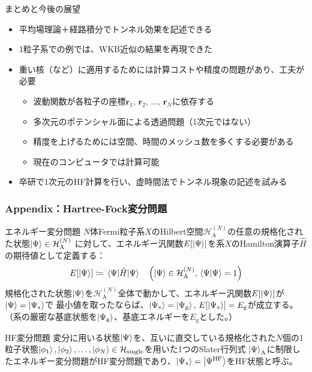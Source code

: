 \documentclass[12pt,aspectratio=169,xcolor=dvipsnames,table,dvipdfmx]{beamer}
\theoremstyle{definition}
\begin{document}
\begin{frame}{まとめと今後の展望}
  \begin{itemize}
    \item 平均場理論＋経路積分でトンネル効果を記述できる
    \item 1粒子系での例では、WKB近似の結果を再現できた
    \item 重い核（など）に適用するためには計算コストや精度の問題があり、工夫が必要
          \begin{itemize}
            \item 波動関数が各粒子の座標$\bm{r}_1,\,\bm{r}_2,\,\dots,\,\bm{r}_N$に依存する
            \item 多次元のポテンシャル面による透過問題（1次元ではない）
            \item 精度を上げるためには空間、時間のメッシュ数を多くする必要がある
            \item 現在のコンピュータでは計算可能
          \end{itemize}
    \item 卒研で1次元のHF計算を行い、虚時間法でトンネル現象の記述を試みる
  \end{itemize}
\end{frame}

\appendix



\begin{frame}
  \small
  \frametitle{Appendix：Hartree-Fock変分問題}
  \begin{block}{エネルギー変分問題}
    $N$体Fermi粒子系$X$のHilbert空間$\mathcal{H}_{\text{A}}^{(N)}$の任意の規格化された状態$\ket{\Psi}\in\mathcal{H}_{\text{A}}^{(N)}$
    に対して、エネルギー汎関数$E[\ket{\Psi}]$を系$X$のHamilton演算子$\hat{H}$の期待値として定義する：
    \begin{equation*}
      E[\ket{\Psi}]\coloneqq \ev{\hat{H}}{\Psi}\quad\qty(\ket{\Psi}\in\mathcal{H}_{\text{A}}^{(N)},\,\braket{\Psi}=1)
    \end{equation*}
    規格化された状態$\ket{\Psi}$を$\mathcal{H}_{\text{A}}^{(N)}$全体で動かして、エネルギー汎関数$E[\ket{\Psi}]$が$\ket{\Psi}=\ket{\Psi_*}$で
    最小値を取ったならば、$\ket{\Psi_*}=\ket{\Psi_{\text{g}}},\,E[\ket{\Psi_*}]=E_{\text{g}}$が成立する。\\
    （系の厳密な基底状態を$\ket{\Psi_{\text{g}}}$、基底エネルギーを$E_{\text{g}}$とした。）
  \end{block}
  \begin{exampleblock}{HF変分問題}
    変分に用いる状態$\ket{\Psi}$を、互いに直交している規格化された$N$個の1粒子状態$\ket{\phi_1},\ket{\phi_2},\ldots,\ket{\phi_{N}}\in\mathcal{H}_{\text{single}}$を用いた1つのSlater行列式
    $\ket{\Psi}_{\text{A}}$に制限したエネルギー変分問題がHF変分問題であり、$\ket{\Psi_*}=\ket{\Psi^{\text{HF}}}$をHF状態と呼ぶ。
  \end{exampleblock}
\end{frame}
\end{document}
